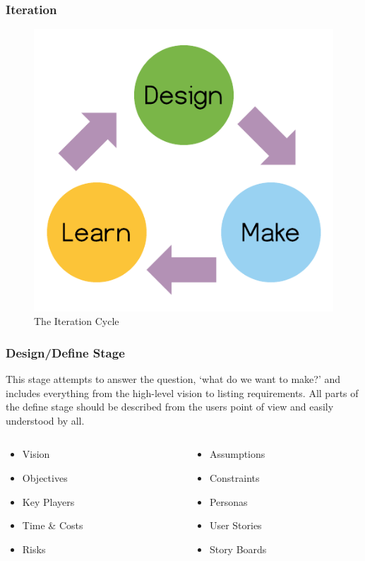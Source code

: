 \begin{frame}
	\frametitle{Iteration}
	\begin{figure}
		\includegraphics[scale=0.4]{assets/iteration.png}
		\caption{The Iteration Cycle}
	\end{figure}
\end{frame}



\begin{frame}
	\frametitle{ Design/Define Stage}
	This stage attempts to answer the question, `what do we want to make?' and includes everything from the high-level vision to listing requirements. All parts of the define stage should be described from the users point of view and easily understood by all. 
	\pause
	\begin{columns}
		\begin{column}{0.5\textwidth}
			\begin{itemize}
				\item Vision
				\item Objectives 
				\item Key Players				
				\item Time \& Costs
				\item Risks
			\end{itemize}
   		\end{column}
		
		\begin{column}{0.5\textwidth}  
			\begin{itemize}
				\item Assumptions
				\item Constraints
				\item Personas		
				\item User Stories
				\item Story Boards
			\end{itemize}
		\end{column}
	\end{columns}
\end{frame}

